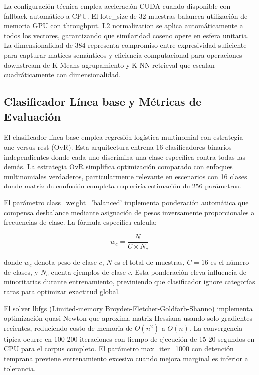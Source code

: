 La configuración técnica emplea aceleración CUDA cuando disponible con fallback automático a CPU. El lote\_size de 32 muestras balancea utilización de memoria GPU con throughput. L2 normalization se aplica automáticamente a todos los vectores, garantizando que similaridad coseno opere en esfera unitaria. La dimensionalidad de 384 representa compromiso entre expresividad suficiente para capturar matices semánticos y eficiencia computacional para operaciones downstream de K-Means agrupamiento y K-NN retrieval que escalan cuadráticamente con dimensionalidad.

\subsection{Clasificador Línea base y Métricas de Evaluación}
\label{subsec:baseline_metricas}

El clasificador línea base emplea regresión logística multinomial con estrategia one-versus-rest (OvR). Esta arquitectura entrena 16 clasificadores binarios independientes donde cada uno discrimina una clase específica contra todas las demás. La estrategia OvR simplifica optimización comparado con enfoques multinomiales verdaderos, particularmente relevante en escenarios con 16 clases donde matriz de confusión completa requeriría estimación de 256 parámetros.

El parámetro class\_weight='balanced' implementa ponderación automática que compensa desbalance mediante asignación de pesos inversamente proporcionales a frecuencias de clase. La fórmula específica calcula:

\begin{equation}
w_c = \frac{N}{C \times N_c}
\end{equation}

donde $w_c$ denota peso de clase $c$, $N$ es el total de muestras, $C=16$ es el número de clases, y $N_c$ cuenta ejemplos de clase $c$. Esta ponderación eleva influencia de minoritarias durante entrenamiento, previniendo que clasificador ignore categorías raras para optimizar exactitud global.

El solver lbfgs (Limited-memory Broyden-Fletcher-Goldfarb-Shanno) implementa optimización quasi-Newton que aproxima matriz Hessiana usando solo gradientes recientes, reduciendo costo de memoria de $O(n^2)$ a $O(n)$. La convergencia típica ocurre en 100-200 iteraciones con tiempo de ejecución de 15-20 segundos en CPU para el corpus completo. El parámetro max\_iter=1000 con detención temprana previene entrenamiento excesivo cuando mejora marginal es inferior a tolerancia.

